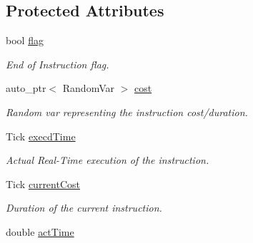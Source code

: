 \subsection*{Protected Attributes}
\begin{DoxyCompactItemize}
\item 
bool \hyperlink{classRTSim_1_1ExecInstr_abc71aa7b4d9c28f480853739a5bd11c6}{flag}\hypertarget{classRTSim_1_1ExecInstr_abc71aa7b4d9c28f480853739a5bd11c6}{}\label{classRTSim_1_1ExecInstr_abc71aa7b4d9c28f480853739a5bd11c6}

\begin{DoxyCompactList}\small\item\em End of Instruction flag. \end{DoxyCompactList}\item 
auto\+\_\+ptr$<$ Random\+Var $>$ \hyperlink{classRTSim_1_1ExecInstr_a59364d932851fe476a01154b764319de}{cost}\hypertarget{classRTSim_1_1ExecInstr_a59364d932851fe476a01154b764319de}{}\label{classRTSim_1_1ExecInstr_a59364d932851fe476a01154b764319de}

\begin{DoxyCompactList}\small\item\em Random var representing the instruction cost/duration. \end{DoxyCompactList}\item 
Tick \hyperlink{classRTSim_1_1ExecInstr_a613162544f50897f4ad19eadbb292add}{execd\+Time}\hypertarget{classRTSim_1_1ExecInstr_a613162544f50897f4ad19eadbb292add}{}\label{classRTSim_1_1ExecInstr_a613162544f50897f4ad19eadbb292add}

\begin{DoxyCompactList}\small\item\em Actual Real-\/\+Time execution of the instruction. \end{DoxyCompactList}\item 
Tick \hyperlink{classRTSim_1_1ExecInstr_a8a548195887c57b7f1cdff3ba6b26d78}{current\+Cost}\hypertarget{classRTSim_1_1ExecInstr_a8a548195887c57b7f1cdff3ba6b26d78}{}\label{classRTSim_1_1ExecInstr_a8a548195887c57b7f1cdff3ba6b26d78}

\begin{DoxyCompactList}\small\item\em Duration of the current instruction. \end{DoxyCompactList}\item 
double \hyperlink{classRTSim_1_1ExecInstr_adf08bddc61622ffa5afcca4380bc5516}{act\+Time}\hypertarget{classRTSim_1_1ExecInstr_adf08bddc61622ffa5afcca4380bc5516}{}\label{classRTSim_1_1ExecInstr_adf08bddc61622ffa5afcca4380bc5516}


\end{DoxyCompactItemize}
